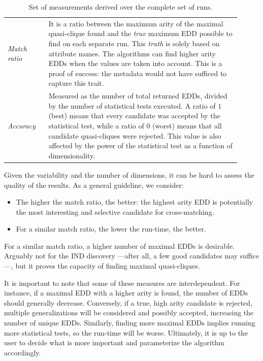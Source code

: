 \begin{table}[ht]
    \caption{Set of measurements derived over the complete set of runs.}
    \label{tab:derived_measurements}
    \centering
    \begin{tabular}{p{0.16\linewidth} p{0.75\linewidth}}
        \emph{Match ratio} & It is a ratio between the maximum arity of the maximal
        quasi-clique found and the \textit{true} maximum \gls{EDD} possible to find on
        each separate run.
        This \emph{truth} is solely based on attribute names. The algorithms can
        find higher arity \glspl{EDD} when the values are taken into account.
        This is a proof of success: the metadata would not have sufficed to capture
        this trait. \\
        
        \emph{Accuracy} & Measured as the number of total returned \glspl{EDD}, divided by
        the number of statistical tests executed. A ratio of $1$ (best) means that every
        candidate was accepted by the statistical test, while a ratio of $0$ (worst)
        means that all candidate quasi-cliques were rejected. This value is
        also affected by the power of the statistical test as a function of
        dimensionality.\\
    \end{tabular}
\end{table}

Given the variability and the number of dimensions, it can be hard to assess the quality
of the results. As a general guideline, we consider:

\begin{itemize}
    \item The higher the match ratio, the better: the highest arity EDD
    is potentially the most interesting and selective candidate for cross-matching.
    \item For a similar match ratio, the lower the run-time, the better.
\end{itemize}

For a similar match ratio, a higher number of maximal \glspl{EDD} is desirable. Arguably not
for the \gls{IND} discovery ---after all, a few good candidates may suffice---,
but it proves the capacity of finding maximal quasi-cliques.

It is important to note that some of these measures are interdependent. For instance,
if a maximal \gls{EDD} with a higher arity is found, the number of \glspl{EDD} should generally decrease.
Conversely, if a true, high arity candidate is rejected, multiple generalizations will be considered
and possibly accepted, increasing the number of unique \glspl{EDD}.
Similarly, finding more maximal \glspl{EDD} implies running more statistical
tests, so the run-time will be worse. Ultimately, it is up to the user to decide what is
more important and parameterize the algorithm accordingly.

